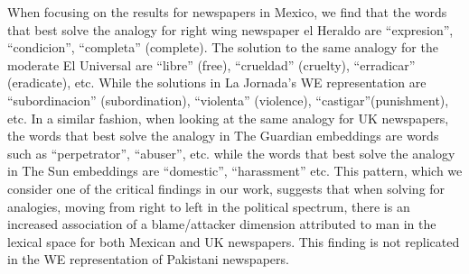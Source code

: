 \documentclass{article}
\begin{document}
{{When focusing on the results for newspapers in Mexico, we find that the words that best solve the analogy for right wing newspaper el Heraldo are “expresion”, “condicion”, “completa” (complete). The solution to the same analogy for the moderate El Universal are “libre” (free), “crueldad” (cruelty), “erradicar” (eradicate), etc. While the solutions in La Jornada’s WE representation are “subordinacion” (subordination), “violenta” (violence), “castigar”(punishment), etc. In a similar fashion, when looking at the same analogy for UK newspapers, the words that best solve the analogy in The Guardian embeddings are words such as “perpetrator”, “abuser”, etc. while the words that best solve the analogy in The Sun embeddings are “domestic”, “harassment” etc. This pattern, which we consider one of the critical findings in our work,  suggests that when solving for analogies,  moving from right to left in the political spectrum, there is an increased association of a blame/attacker dimension attributed to man in the lexical space for both Mexican and UK newspapers. This finding is not replicated in the WE representation of Pakistani newspapers. 


}}
\end{document}

